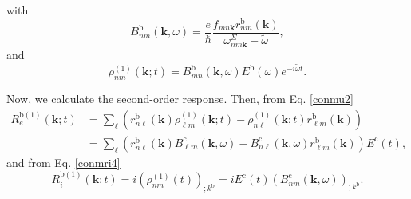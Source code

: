 with
\begin{equation}\label{rho1} 
B^{\mathrm{b}}_{nm}(\mathbf{k},\omega)=
\frac{e}{\hbar}\frac{f_{mn\mathbf{k}}r^{\mathrm{b}}_{nm}(\mathbf{k})}{\omega^\Sigma_{nm\mathbf{k}}-\tilde{\omega}}
,
\end{equation} 
and
\begin{equation}\label{rhonoi1}
\rho^{(1)}_{nm}(\mathbf{k};t)=B^{\mathrm{b}}_{mn}(\mathbf{k},\omega)E^{\mathrm{b}}(\omega)e^{-i\tilde{\omega} t}
.
\end{equation}

Now, we calculate the second-order response. Then, from Eq. \eqref{conmu2}
\begin{align}\label{R1e}
R_e^{\mathrm{b}(1)}(\mathbf{k};t)
&=
\sum_{\ell}
\left(
r^{\mathrm{b}}_{n\ell}(\mathbf{k})
\rho^{(1)}_{\ell m}(\mathbf{k};t)
-
\rho^{(1)}_{n\ell}(\mathbf{k};t)
r^{\mathrm{b}}_{\ell m}(\mathbf{k})
\right)
\nonumber \\
&=
\sum_{\ell}
\left(
r^{\mathrm{b}}_{n\ell}(\mathbf{k})
B^{\mathrm{c}}_{\ell m}(\mathbf{k},\omega)
-
B^{\mathrm{c}}_{n\ell}(\mathbf{k},\omega)
r^{\mathrm{b}}_{\ell m}(\mathbf{k})
\right)E^{\mathrm{c}}(t)
,
\end{align}
and from Eq. \eqref{conmri4}
\begin{equation}\label{R1i}
R_i^{\mathrm{b}(1)}(\mathbf{k};t)=
i(\rho^{(1)}_{nm}(t))_{;k^{\mathrm{b}}}=
iE^{\mathrm{c}}(t)(B^{\mathrm{c}}_{nm}(\mathbf{k},\omega))_{;k^{\mathrm{b}}}
.
\end{equation}

